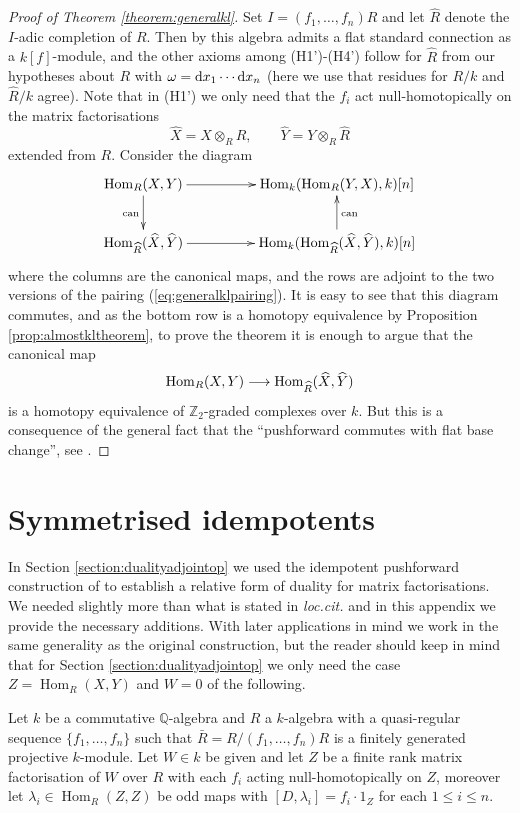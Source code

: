 \documentclass{compositio}
\theoremstyle{definition}
\numberwithin{equation}{section}
\def\can{\operatorname{can}}
\def\Hom{\operatorname{Hom}}
\begin{document}
\begin{proof}[Proof of Theorem \ref{theorem:generalkl}] Set $I = (f_1,\ldots,f_n)R$ and let $\widehat{R}$ denote the $I$-adic completion of $R$. Then by \cite{??} this algebra admits a flat standard connection as a $k[f]$-module, and the other axioms among (H1')-(H4') follow for $\widehat{R}$ from our hypotheses about $R$ with $\omega = \mathrm{d} x_1 \cdots \mathrm{d} x_n$ (here we use that residues for $R/k$ and $\widehat{R}/k$ agree). Note that in (H1') we only need that the $f_i$ act null-homotopically on the matrix factorisations
\[
\widehat{X} = X \otimes_R \widehat{R}, \qquad \widehat{Y} = Y \otimes_R \widehat{R}
\]
extended from $R$. Consider the diagram
\[
\xymatrix@C+2pc{
\Hom_R(X,Y) \ar[d]_{\can} \ar[r] & \Hom_k( \Hom_R(Y,X), k )[n]\\
\Hom_{\widehat{R}}(\widehat{X}, \widehat{Y}) \ar[r] & \Hom_k( \Hom_{\widehat{R}}(\widehat{X}, \widehat{Y}), k)[n] \ar[u]_{\can}
}
\]
where the columns are the canonical maps, and the rows are adjoint to the two versions of the pairing (\ref{eq:generalklpairing}). It is easy to see that this diagram commutes, and as the bottom row is a homotopy equivalence by Proposition \ref{prop:almostkltheorem}, to prove the theorem it is enough to argue that the canonical map
\[
\Hom_R(X,Y) \lto \Hom_{\widehat{R}}(\widehat{X}, \widehat{Y})
\]
is a homotopy equivalence of $\mathbb{Z}_2$-graded complexes over $k$. But this is a consequence of the general fact that the ``pushforward commutes with flat base change'', see \cite[Remark 7.7]{??}.
\end{proof}

\section{Symmetrised idempotents}\label{section:symidem}

In Section \ref{section:dualityadjointop} we used the idempotent pushforward construction of \cite{dm1102.2957} to establish a relative form of duality for matrix factorisations. We needed slightly more than what is stated in \emph{loc.cit.} and in this appendix we provide the necessary additions. With later applications in mind we work in the same generality as the original construction, but the reader should keep in mind that for Section \ref{section:dualityadjointop} we only need the case $Z = \Hom_R(X,Y)$ and $W = 0$ of the following.

Let $k$ be a commutative $\mathbb{Q}$-algebra and $R$ a $k$-algebra with a quasi-regular sequence $\{ f_1, \ldots, f_n \}$ such that $\bar{R} = R/(f_1,\ldots,f_n)R$ is a finitely generated projective $k$-module. Let $W \in k$ be given and let $Z$ be a finite rank matrix factorisation of $W$ over $R$ with each $f_i$ acting null-homotopically on $Z$, moreover let $\lambda_i \in \Hom_R(Z,Z)$ be odd maps with $[D, \lambda_i] = f_i \cdot 1_Z$ for each $1 \le i \le n$.
\end{document}
